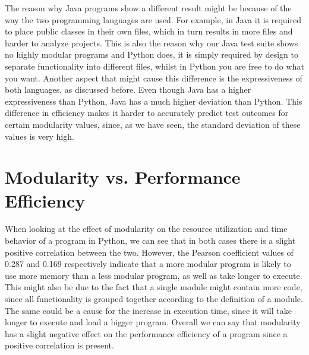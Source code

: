 \documentclass[twoside]{uva-inf-bachelor-thesis}
\begin{document}
The reason why Java programs show a different result might be because of the way the two programming languages are used. For example, in Java it is required to place public classes in their own files, which in turn results in more files and harder to analyze projects. This is also the reason why our Java test suite shows no highly modular programs and Python does, it is simply required by design to separate functionality into different files, whilst in Python you are free to do what you want. Another aspect that might cause this  difference is the expressiveness of both languages, as discussed before. Even though Java has a higher expressiveness than Python\cite{Expressiveness}, Java has a much higher deviation than Python. This difference in efficiency makes it harder to accurately predict test outcomes for certain modularity values, since, as we have seen, the standard deviation of these values is very high.

\section{Modularity vs. Performance Efficiency}
When looking at the effect of modularity on the resource utilization and time behavior of a program in Python, we can see that in both cases there is a slight positive correlation between the two. However, the Pearson coefficient values of 0.287 and 0.169 respectively indicate that a more modular program is likely to use more memory than a less modular program, as well as take longer to execute. This might also be due to the fact that a single module might contain more code, since all functionality is grouped together according to the definition of a module. The same could be a cause for the increase in execution time, since it will take longer to execute and load a bigger program. Overall we can say that modularity has a slight negative effect on the performance efficiency of a program since a positive correlation is present. 
\end{document}
